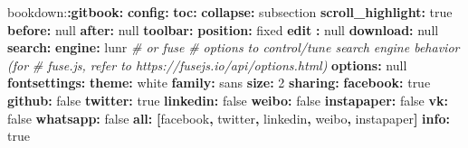 \documentclass[
  12pt,
]{krantz}
\newenvironment{Shaded}{\begin{snugshade}}{\end{snugshade}}
\newcommand{\AttributeTok}[1]{\textcolor[rgb]{0.13,0.29,0.53}{#1}}
\newcommand{\CharTok}[1]{\textcolor[rgb]{0.31,0.60,0.02}{#1}}
\newcommand{\CommentTok}[1]{\textcolor[rgb]{0.56,0.35,0.01}{\textit{#1}}}
\newcommand{\DecValTok}[1]{\textcolor[rgb]{0.00,0.00,0.81}{#1}}
\newcommand{\FunctionTok}[1]{\textcolor[rgb]{0.13,0.29,0.53}{\textbf{#1}}}
\newcommand{\KeywordTok}[1]{\textcolor[rgb]{0.13,0.29,0.53}{\textbf{#1}}}
\newcommand{\StringTok}[1]{\textcolor[rgb]{0.31,0.60,0.02}{#1}}
\theoremstyle{definition}
\theoremstyle{definition}
\theoremstyle{definition}
\theoremstyle{definition}
\theoremstyle{remark}
\begin{document}
\begin{Shaded}
\begin{Highlighting}[]
\AttributeTok{bookdown:}\FunctionTok{:gitbook}\KeywordTok{:}
\AttributeTok{  }\FunctionTok{config}\KeywordTok{:}
\AttributeTok{    }\FunctionTok{toc}\KeywordTok{:}
\AttributeTok{      }\FunctionTok{collapse}\KeywordTok{:}\AttributeTok{ subsection}
\AttributeTok{      }\FunctionTok{scroll\_highlight}\KeywordTok{:}\AttributeTok{ }\CharTok{true}
\AttributeTok{      }\FunctionTok{before}\KeywordTok{:}\AttributeTok{ }\CharTok{null}
\AttributeTok{      }\FunctionTok{after}\KeywordTok{:}\AttributeTok{ }\CharTok{null}
\AttributeTok{    }\FunctionTok{toolbar}\KeywordTok{:}
\AttributeTok{      }\FunctionTok{position}\KeywordTok{:}\AttributeTok{ fixed}
\AttributeTok{    }\FunctionTok{edit }\KeywordTok{:}\AttributeTok{ }\CharTok{null}
\AttributeTok{    }\FunctionTok{download}\KeywordTok{:}\AttributeTok{ }\CharTok{null}
\AttributeTok{    }\FunctionTok{search}\KeywordTok{:}
\AttributeTok{      }\FunctionTok{engine}\KeywordTok{:}\AttributeTok{ lunr}\CommentTok{ \# or fuse}
\CommentTok{      \# options to control/tune search engine behavior (for}
\CommentTok{      \# fuse.js, refer to https://fusejs.io/api/options.html)}
\AttributeTok{      }\FunctionTok{options}\KeywordTok{:}\AttributeTok{ }\CharTok{null}
\AttributeTok{    }\FunctionTok{fontsettings}\KeywordTok{:}
\AttributeTok{      }\FunctionTok{theme}\KeywordTok{:}\AttributeTok{ white}
\AttributeTok{      }\FunctionTok{family}\KeywordTok{:}\AttributeTok{ sans}
\AttributeTok{      }\FunctionTok{size}\KeywordTok{:}\AttributeTok{ }\DecValTok{2}
\AttributeTok{    }\FunctionTok{sharing}\KeywordTok{:}
\AttributeTok{      }\FunctionTok{facebook}\KeywordTok{:}\AttributeTok{ }\CharTok{true}
\AttributeTok{      }\FunctionTok{github}\KeywordTok{:}\AttributeTok{ }\CharTok{false}
\AttributeTok{      }\FunctionTok{twitter}\KeywordTok{:}\AttributeTok{ }\CharTok{true}
\AttributeTok{      }\FunctionTok{linkedin}\KeywordTok{:}\AttributeTok{ }\CharTok{false}
\AttributeTok{      }\FunctionTok{weibo}\KeywordTok{:}\AttributeTok{ }\CharTok{false}
\AttributeTok{      }\FunctionTok{instapaper}\KeywordTok{:}\AttributeTok{ }\CharTok{false}
\AttributeTok{      }\FunctionTok{vk}\KeywordTok{:}\AttributeTok{ }\CharTok{false}
\AttributeTok{      }\FunctionTok{whatsapp}\KeywordTok{:}\AttributeTok{ }\CharTok{false}
\AttributeTok{      }\FunctionTok{all}\KeywordTok{:}\AttributeTok{ }\KeywordTok{[}\StringTok{\textquotesingle{}facebook\textquotesingle{}}\KeywordTok{,}\AttributeTok{ }\StringTok{\textquotesingle{}twitter\textquotesingle{}}\KeywordTok{,}\AttributeTok{ }\StringTok{\textquotesingle{}linkedin\textquotesingle{}}\KeywordTok{,}\AttributeTok{ }\StringTok{\textquotesingle{}weibo\textquotesingle{}}\KeywordTok{,}\AttributeTok{ }\StringTok{\textquotesingle{}instapaper\textquotesingle{}}\KeywordTok{]}
\AttributeTok{    }\FunctionTok{info}\KeywordTok{:}\AttributeTok{ }\CharTok{true}
\end{Highlighting}
\end{Shaded}
\end{document}
